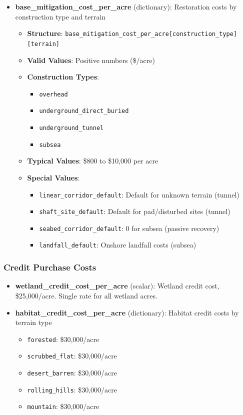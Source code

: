 \documentclass[ctcc_full_documentation.tex]{subfiles}
\begin{document}
\begin{itemize}
    \item \textbf{base\_mitigation\_cost\_per\_acre} (dictionary): Restoration costs by construction type and terrain
    \begin{itemize}
        \item \textbf{Structure}: \texttt{base\_mitigation\_cost\_per\_acre[construction\_type][terrain]}
        \item \textbf{Valid Values}: Positive numbers (\$/acre)
        \item \textbf{Construction Types}:
        \begin{itemize}
            \item \texttt{overhead}
            \item \texttt{underground\_direct\_buried}
            \item \texttt{underground\_tunnel}
            \item \texttt{subsea}
        \end{itemize}
        \item \textbf{Typical Values}: \$800 to \$10,000 per acre
        \item \textbf{Special Values}:
        \begin{itemize}
            \item \texttt{linear\_corridor\_default}: Default for unknown terrain (tunnel)
            \item \texttt{shaft\_site\_default}: Default for pad/disturbed sites (tunnel)
            \item \texttt{seabed\_corridor\_default}: 0 for subsea (passive recovery)
            \item \texttt{landfall\_default}: Onshore landfall costs (subsea)
        \end{itemize}
    \end{itemize}
\end{itemize}

\subsubsection{Credit Purchase Costs}

\begin{itemize}
    \item \textbf{wetland\_credit\_cost\_per\_acre} (scalar): Wetland credit cost, \$25,000/acre. Single rate for all wetland acres.
    \item \textbf{habitat\_credit\_cost\_per\_acre} (dictionary): Habitat credit costs by terrain type
    \begin{itemize}
        \item \texttt{forested}: \$30,000/acre
        \item \texttt{scrubbed\_flat}: \$30,000/acre
        \item \texttt{desert\_barren}: \$30,000/acre
        \item \texttt{rolling\_hills}: \$30,000/acre
        \item \texttt{mountain}: \$30,000/acre
    \end{itemize}
\end{itemize}
\end{document}
